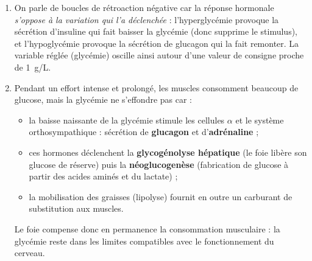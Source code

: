 \documentclass[11pt]{article}
\begin{document}
\begin{corrige}
\begin{enumerate}
\begin{popfigure}
\end{popfigure}
\item On parle de \og boucles de rétroaction négative \fg{} car la réponse hormonale \emph{s'oppose à la variation qui l'a déclenchée} : l'hyperglycémie provoque la sécrétion d'insuline qui fait baisser la glycémie (donc supprime le stimulus), et l'hypoglycémie provoque la sécrétion de glucagon qui la fait remonter. La variable réglée (glycémie) oscille ainsi autour d'une valeur de consigne proche de \SI{1}{g/L}.
\item Pendant un effort intense et prolongé, les muscles consomment beaucoup de glucose, mais la glycémie ne s'effondre pas car :
\begin{itemize}
\item la baisse naissante de la glycémie stimule les cellules $\alpha$ et le système orthosympathique : sécrétion de \textbf{glucagon} et d'\textbf{adrénaline} ;
\item ces hormones déclenchent la \textbf{glycogénolyse hépatique} (le foie libère son glucose de réserve) puis la \textbf{néoglucogenèse} (fabrication de glucose à partir des acides aminés et du lactate) ;
\item la mobilisation des graisses (lipolyse) fournit en outre un carburant de substitution aux muscles.
\end{itemize}
Le foie compense donc en permanence la consommation musculaire : la glycémie reste dans les limites compatibles avec le fonctionnement du cerveau.
\end{enumerate}
\end{corrige}
\end{document}
